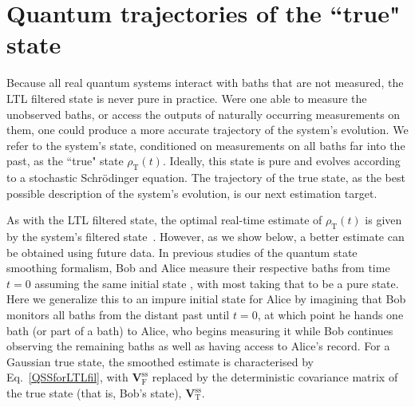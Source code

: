 \documentclass[aps,prx,twocolumn,amsmath,amssymb,superscriptaddress,floatfix,longbibliography
]{revtex4-2}
\begin{document}

\section{Quantum trajectories of the ``true" state} \label{Sec:true}

Because all real quantum systems interact with baths that are not measured, the LTL filtered state is never pure in practice.
Were one able to measure the
unobserved baths, or access the outputs of naturally occurring measurements on them, one could produce a more accurate trajectory of the system’s evolution. We refer to the system’s state, conditioned on measurements on all baths far into the past, as the ``true" state $\rho_\text{T}(t)$. Ideally, this state is pure and evolves according to a stochastic Schrödinger equation. The trajectory of the true state, as the
best possible description of the system’s evolution, is our next estimation target.

As with the LTL filtered state, the optimal real-time estimate of $\rho_\text{T}(t)$ is given by the system’s filtered state~\cite{guevara2015quantum}. However, as we show below, a better estimate can be obtained using future data. In previous studies of the quantum state smoothing formalism, Bob and Alice measure their respective baths from time $t=0$ assuming the same initial state \cite{guevara2015quantum,GueWis20,laverick2021quantum,laverick2021linear,CGLW21,LGW21}, with most taking that to be a pure state. Here we generalize this to an impure initial state for Alice by imagining that Bob monitors all baths from the distant past until $t=0$, at which point he hands one bath (or part of a bath) to Alice, who begins measuring it while Bob continues observing the remaining baths as well as having access to Alice's record. For a Gaussian true state, the smoothed estimate is characterised by Eq.~\eqref{QSSforLTLfil}, with $\mathbf{V}_\text{F}^\text{ss}$ replaced by the deterministic covariance matrix of the true state (that is, Bob's state), \blk $\mathbf{V}_\text{T}^\text{ss}$.
\end{document}
